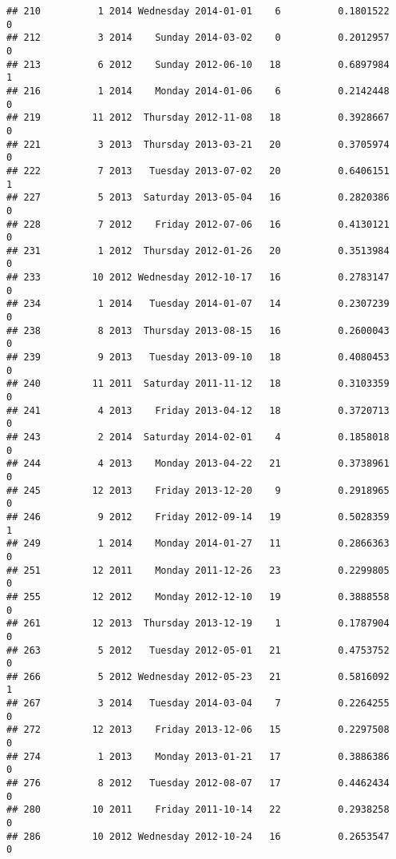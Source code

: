 \documentclass[
]{article}
\begin{document}
\begin{verbatim}
## 210          1 2014 Wednesday 2014-01-01    6          0.1801522             0
## 212          3 2014    Sunday 2014-03-02    0          0.2012957             0
## 213          6 2012    Sunday 2012-06-10   18          0.6897984             1
## 216          1 2014    Monday 2014-01-06    6          0.2142448             0
## 219         11 2012  Thursday 2012-11-08   18          0.3928667             0
## 221          3 2013  Thursday 2013-03-21   20          0.3705974             0
## 222          7 2013   Tuesday 2013-07-02   20          0.6406151             1
## 227          5 2013  Saturday 2013-05-04   16          0.2820386             0
## 228          7 2012    Friday 2012-07-06   16          0.4130121             0
## 231          1 2012  Thursday 2012-01-26   20          0.3513984             0
## 233         10 2012 Wednesday 2012-10-17   16          0.2783147             0
## 234          1 2014   Tuesday 2014-01-07   14          0.2307239             0
## 238          8 2013  Thursday 2013-08-15   16          0.2600043             0
## 239          9 2013   Tuesday 2013-09-10   18          0.4080453             0
## 240         11 2011  Saturday 2011-11-12   18          0.3103359             0
## 241          4 2013    Friday 2013-04-12   18          0.3720713             0
## 243          2 2014  Saturday 2014-02-01    4          0.1858018             0
## 244          4 2013    Monday 2013-04-22   21          0.3738961             0
## 245         12 2013    Friday 2013-12-20    9          0.2918965             0
## 246          9 2012    Friday 2012-09-14   19          0.5028359             1
## 249          1 2014    Monday 2014-01-27   11          0.2866363             0
## 251         12 2011    Monday 2011-12-26   23          0.2299805             0
## 255         12 2012    Monday 2012-12-10   19          0.3888558             0
## 261         12 2013  Thursday 2013-12-19    1          0.1787904             0
## 263          5 2012   Tuesday 2012-05-01   21          0.4753752             0
## 266          5 2012 Wednesday 2012-05-23   21          0.5816092             1
## 267          3 2014   Tuesday 2014-03-04    7          0.2264255             0
## 272         12 2013    Friday 2013-12-06   15          0.2297508             0
## 274          1 2013    Monday 2013-01-21   17          0.3886386             0
## 276          8 2012   Tuesday 2012-08-07   17          0.4462434             0
## 280         10 2011    Friday 2011-10-14   22          0.2938258             0
## 286         10 2012 Wednesday 2012-10-24   16          0.2653547             0

\end{verbatim}
\end{document}
